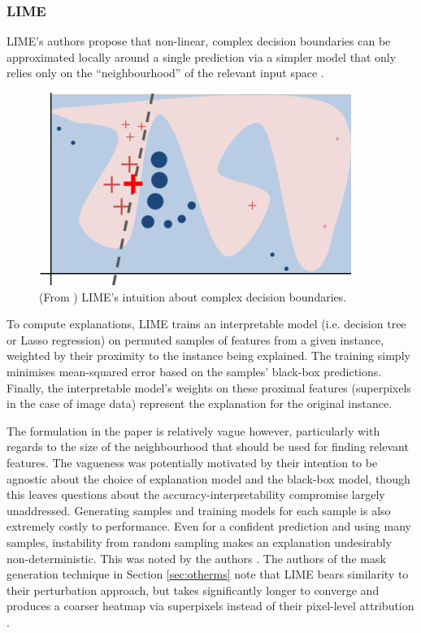 \documentclass[main]{subfiles}
\begin{document}
\subsubsection{LIME}
LIME's authors propose that non-linear, complex decision boundaries can be approximated locally around a single prediction via a simpler model that only relies only on the ``neighbourhood'' of the relevant input space \cite{lime}. 

\begin{figure}[h]
\centering
\includegraphics[scale=0.65]{lime_figure.png}
\caption{(From \cite{lime}) LIME's intuition about complex decision boundaries.}
\label{limeimg}
\end{figure}

To compute explanations, LIME trains an interpretable model (i.e. decision tree or Lasso regression) on permuted samples of features from a given instance, weighted by their proximity to the instance being explained. The training simply minimises mean-squared error based on the samples' black-box predictions. Finally, the interpretable model's weights on these proximal features (superpixels in the case of image data) represent the explanation for the original instance. 

The formulation in the paper is relatively vague however, particularly with regards to the size of the neighbourhood that should be used for finding relevant features. The vagueness was potentially motivated by their intention to be agnostic about the choice of explanation model and the black-box model, though this leaves questions about the accuracy-interpretability compromise largely unaddressed. Generating samples and training models for each sample is also extremely costly to performance. Even for a confident prediction and using many samples, instability from random sampling makes an explanation undesirably non-deterministic. This was noted by the authors \cite{lime}. The authors of the mask generation technique in Section \ref{sec:otherms} note that LIME bears similarity to their perturbation approach, but takes significantly longer to converge and produces a coarser heatmap via superpixels instead of their pixel-level attribution \cite{perturb_fong}.
\end{document}
